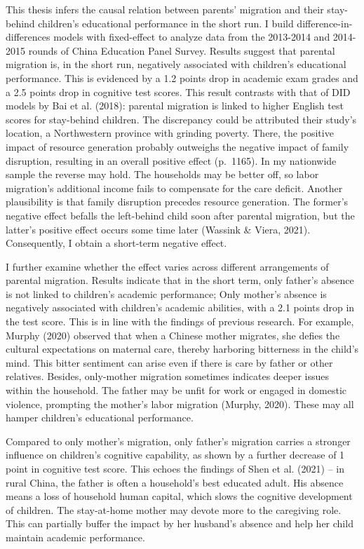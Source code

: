 \documentclass[
  man,floatsintext]{apa7}
\begin{document}
This thesis infers the causal relation between parents' migration and their stay-behind children's educational performance in the short run. I build difference-in-differences models with fixed-effect to analyze data from the 2013-2014 and 2014-2015 rounds of China Education Panel Survey. Results suggest that parental migration is, in the short run, negatively associated with children's educational performance. This is evidenced by a 1.2 points drop in academic exam grades and a 2.5 points drop in cognitive test scores. This result contrasts with that of DID models by Bai et al. (2018): parental migration is linked to higher English test scores for stay-behind children. The discrepancy could be attributed their study's location, a Northwestern province with grinding poverty. There, the positive impact of resource generation probably outweighs the negative impact of family disruption, resulting in an overall positive effect (p.~1165). In my nationwide sample the reverse may hold. The households may be better off, so labor migration's additional income fails to compensate for the care deficit. Another plausibility is that family disruption precedes resource generation. The former's negative effect befalls the left-behind child soon after parental migration, but the latter's positive effect occurs some time later (Wassink \& Viera, 2021). Consequently, I obtain a short-term negative effect.

I further examine whether the effect varies across different arrangements of parental migration. Results indicate that in the short term, only father's absence is not linked to children's academic performance; Only mother's absence is negatively associated with children's academic abilities, with a 2.1 points drop in the test score. This is in line with the findings of previous research. For example, Murphy (2020) observed that when a Chinese mother migrates, she defies the cultural expectations on maternal care, thereby harboring bitterness in the child's mind. This bitter sentiment can arise even if there is care by father or other relatives. Besides, only-mother migration sometimes indicates deeper issues within the household. The father may be unfit for work or engaged in domestic violence, prompting the mother's labor migration (Murphy, 2020). These may all hamper children's educational performance.

Compared to only mother's migration, only father's migration carries a stronger influence on children's cognitive capability, as shown by a further decrease of 1 point in cognitive test score. This echoes the findings of Shen et al. (2021) -- in rural China, the father is often a household's best educated adult. His absence means a loss of household human capital, which slows the cognitive development of children. The stay-at-home mother may devote more to the caregiving role. This can partially buffer the impact by her husband's absence and help her child maintain academic performance.
\end{document}
